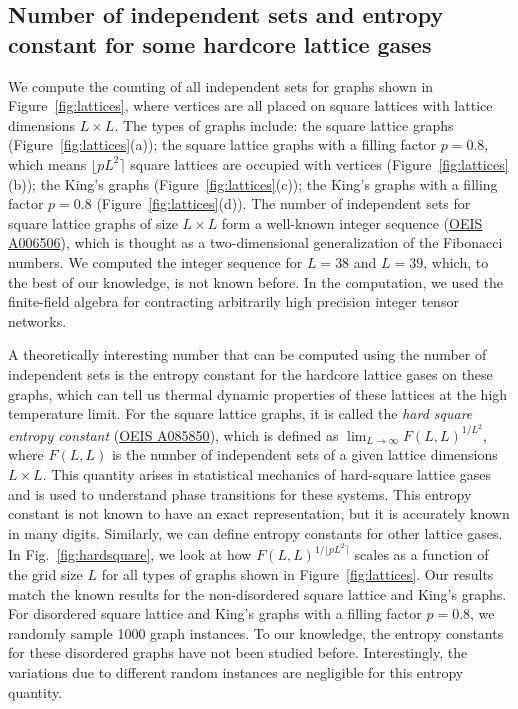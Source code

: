 \documentclass[onefignum, onetabnum]{siamart190516}
\newcommand{\<}{\langle}
\renewcommand{\>}{\rangle}
\newcommand{\Fig}[1]{Fig.~\ref{#1}}
\begin{document}
\subsection{Number of independent sets and entropy constant for some hardcore lattice gases}\label{sec:entropy}
We compute the counting of all independent sets for graphs shown in Figure~\ref{fig:lattices}, where vertices are all placed on square lattices with lattice dimensions $L \times L$.
The types of graphs include: the square lattice graphs (Figure~\ref{fig:lattices}(a)); the square lattice graphs with a filling factor $p=0.8$, which means $\lfloor pL^{2} \rceil$ square lattices are occupied with vertices  (Figure~\ref{fig:lattices}(b));
the King's graphs  (Figure~\ref{fig:lattices}(c)); the King's graphs with a filling factor $p = 0.8$  (Figure~\ref{fig:lattices}(d)).
The number of independent sets for square lattice graphs of size $L \times L$ form a well-known integer sequence (\href{https://oeis.org/A006506}{OEIS A006506}), which is thought as a two-dimensional generalization of the Fibonacci numbers.
We computed the integer sequence for $L=38$ and $L=39$, which, to the best of our knowledge, is not known before.
In the computation, we used the finite-field algebra for contracting arbitrarily high precision integer tensor networks. 

A theoretically interesting number that can be computed using the number of independent sets is the entropy constant for the hardcore lattice gases on these graphs, which can tell us thermal dynamic properties of these lattices at the high temperature limit.
For the square lattice graphs, it is called the \textit{hard square entropy constant} (\href{https://oeis.org/A085850}{OEIS A085850}), which is defined as $\lim_{L\rightarrow \infty} F(L,L)^{1/L^2}$, where $F(L,L)$ is the number of independent sets of a given lattice dimensions $L \times L$. This quantity arises in statistical mechanics of hard-square lattice gases~\cite{Baxter1980, Pearce1988} and is used to understand phase transitions for these systems. This entropy constant is not known to have an exact representation, but it is accurately known in many digits. Similarly, we can define entropy constants for other lattice gases. In \Fig{fig:hardsquare}, we look at how $F(L,L)^{1/\lfloor pL^2\rceil}$ scales as a function of the grid size $L$ for all types of graphs shown in Figure~\ref{fig:lattices}. Our results match the known results for the non-disordered square lattice and King's graphs. For disordered square lattice and King's graphs with a filling factor $p=0.8$, we randomly sample 1000 graph instances. To our knowledge, the entropy constants for these disordered graphs have not been studied before. Interestingly, the variations due to different random instances are negligible for this entropy quantity. 
\end{document}
